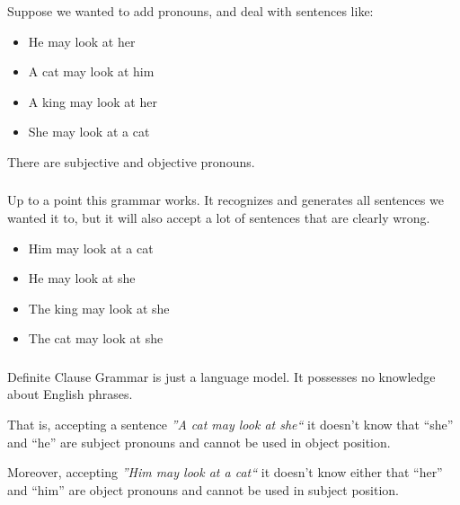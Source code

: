 \begin{frame}
	\frametitle{\insertsection}
	
	Suppose we wanted to add pronouns, and deal with sentences like:
	
	\begin{itemize}
		\item He may look at her
		\item A cat may look at him
		\item A king may look at her
		\item She may look at a cat
	\end{itemize}

	There are subjective and objective pronouns.
\end{frame}




\begin{frame}
	\frametitle{\insertsection}
	
	Up to a point this grammar works. It recognizes and generates all sentences we wanted it to, but it will also accept a lot of sentences that are clearly wrong.
	
	\begin{itemize}
		\item Him may look at a cat
		\item He may look at she
		\item The king may look at she
		\item The cat may look at she
	\end{itemize}
	
\end{frame}


\begin{frame}
	\frametitle{\insertsection}

	Definite Clause Grammar is just a language model. It possesses no knowledge about English phrases. 
	
	That is, accepting a sentence \textit{''A cat may look at she``} it doesn’t know that “she” and “he” are subject pronouns and cannot be used in object position.
	
	Moreover, accepting \textit{''Him may look at a cat``} it doesn't know either that “her” and “him” are object pronouns and cannot be used in subject position.
	
\end{frame}


